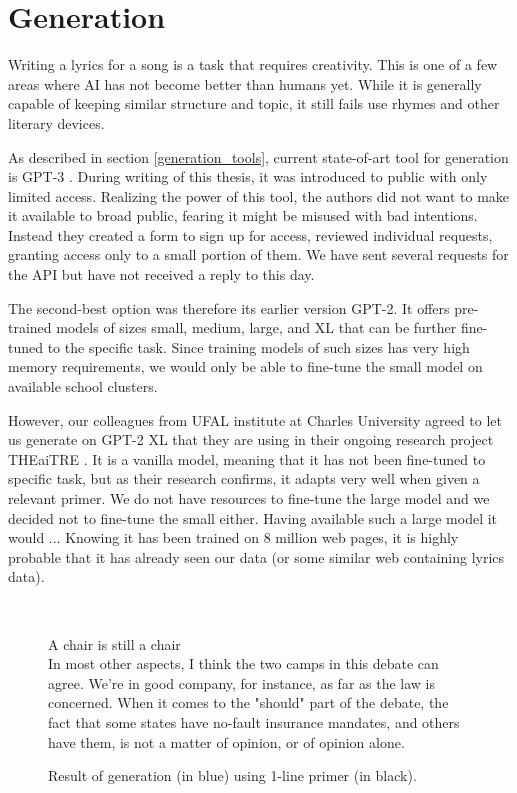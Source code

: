 \chapter{Generation}
Writing a lyrics for a song is a task that requires creativity. This is one of a few areas where AI has not become better than humans yet. While it is generally capable of keeping similar structure and topic, it still fails use rhymes and other literary devices.

As described in section \ref{generation_tools}, current state-of-art tool for generation is GPT-3 \cite{brown2020language}. During writing of this thesis, it was introduced to public with only limited access. Realizing the power of this tool, the authors did not want to make it available to broad public, fearing it might be misused with bad intentions. Instead they created a form to sign up for access, reviewed individual requests, granting access only to a small portion of them. We have sent several requests for the API but have not received a reply to this day.

The second-best option was therefore its earlier version GPT-2. It offers pre-trained models of sizes small, medium, large, and XL that can be further fine-tuned to the specific task. Since training models of such sizes has very high memory requirements, we would only be able to fine-tune the small model on available school clusters. 

However, our colleagues from UFAL institute at Charles University agreed to let us generate on GPT-2 XL that they are using in their ongoing research project THEaiTRE \cite{rosa2021theaitre}. It is a vanilla model, meaning that it has not been fine-tuned to specific task, but as their research confirms, it adapts very well when given a relevant primer. We do not have resources to fine-tune the large model and we decided not to fine-tune the small either. Having available such a large model it would ... Knowing it has been trained on 8 million web pages, it is highly probable that it has already seen our data (or some similar web containing lyrics data). 

\
\begin{figure}[htb]\centering
	A chair is still a chair \\
	\color{blue}In most other aspects, I think the two camps in this debate can agree. We're in good company, for instance, as far as the law is concerned. When it comes to the "should" part of the debate, the fact that some states have no-fault insurance mandates, and others have them, is not a matter of opinion, or of opinion alone. \\
	\endminipage\hfill
	\caption{Result of generation (in blue) using 1-line primer (in black).} \label{fig_1line_primer}
\end{figure} 





